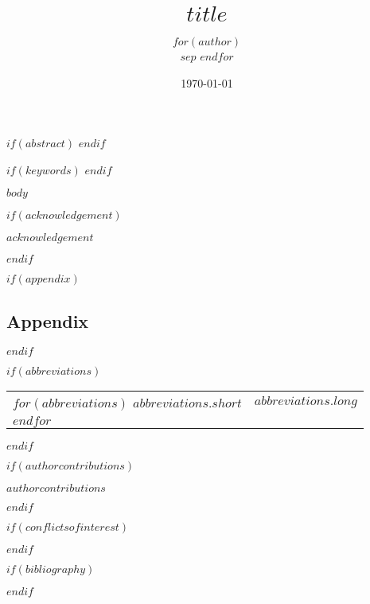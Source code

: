 \documentclass[12pt,halfline,a4paper]{ouparticle}
\title{$title$}
\author{$for(author)$%
\name{$author.name$}
\address{$author.affiliation$}%
$sep$ $endfor$}
\begin{document}




\date{\today}

$if(abstract)$
$endif$

$if(keywords)$
$endif$



\maketitle

$body$

$if(acknowledgement)$
\begin{notes}[Acknowledgements]
$acknowledgement$
\end{notes}
$endif$


$if(appendix)$
\subsection{Appendix}

$endif$

$if(abbreviations)$
\begin{notes}[Abbreviations]
\noindent
\begin{tabular}{@{}ll}
$for(abbreviations)$
$abbreviations.short$ & $abbreviations.long$ \\
$endfor$
\end{tabular}
\end{notes}
$endif$


$if(authorcontributions)$
\begin{notes}
$authorcontributions$
\end{notes}
$endif$

$if(conflictsofinterest)$
\begin{notes}
\end{notes}
$endif$

$if(bibliography)$

$endif$
\end{document}
